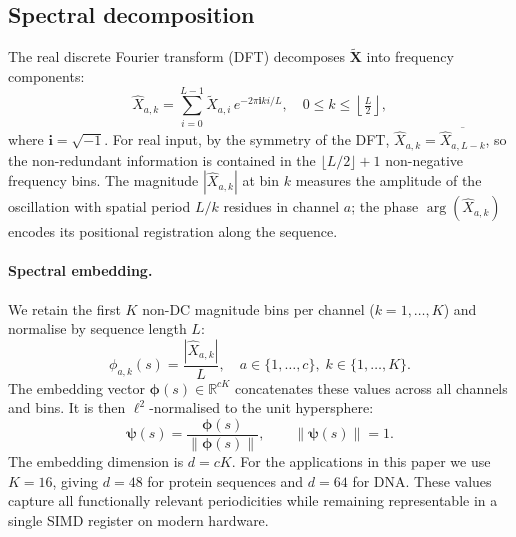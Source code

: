 \documentclass[twocolumn,11pt,a4paper]{article}
\theoremstyle{definition}
\theoremstyle{remark}
\newcommand{\RR}{\mathbb{R}}
\newcommand{\norm}[1]{\left\| #1 \right\|}
\begin{document}
\subsection{Spectral decomposition}
\label{sec:spectral_decomp}

The real discrete Fourier transform (DFT) decomposes
$\widetilde{\mathbf{X}}$ into frequency components:
\begin{equation}
  \widehat{X}_{a,k}
  = \sum_{i=0}^{L-1} \widetilde{X}_{a,i}\,
    e^{-2\pi \mathbf{i} k i / L},
  \quad 0 \leq k \leq \left\lfloor \tfrac{L}{2} \right\rfloor,
  \label{eq:dft}
\end{equation}
where $\mathbf{i} = \sqrt{-1}$. For real input, by the symmetry of the DFT,
$\widehat{X}_{a,k} = \overline{\widehat{X}_{a,L-k}}$, so the non-redundant
information is contained in the $\lfloor L/2 \rfloor + 1$ non-negative
frequency bins. The magnitude $|\widehat{X}_{a,k}|$ at bin $k$ measures the
amplitude of the oscillation with spatial period $L/k$ residues in channel
$a$; the phase $\arg(\widehat{X}_{a,k})$ encodes its positional registration
along the sequence.

\paragraph{Spectral embedding.}
We retain the first $K$ non-DC magnitude bins per channel
($k = 1, \ldots, K$) and normalise by sequence length $L$:
\begin{equation}
  \phi_{a,k}(s) = \frac{|\widehat{X}_{a,k}|}{L},
  \quad a \in \{1,\ldots,c\},\; k \in \{1,\ldots,K\}.
  \label{eq:spectral_embed}
\end{equation}
The embedding vector $\bm{\phi}(s) \in \RR^{cK}$ concatenates these values
across all channels and bins. It is then $\ell^2$-normalised to the unit
hypersphere:
\begin{equation}
  \bm{\psi}(s) = \frac{\bm{\phi}(s)}{\norm{\bm{\phi}(s)}},
  \qquad \norm{\bm{\psi}(s)} = 1.
  \label{eq:l2norm}
\end{equation}
The embedding dimension is $d = cK$. For the applications in this paper we use
$K = 16$, giving $d = 48$ for protein sequences and $d = 64$ for DNA. These
values capture all functionally relevant periodicities while remaining
representable in a single SIMD register on modern hardware.
\end{document}
